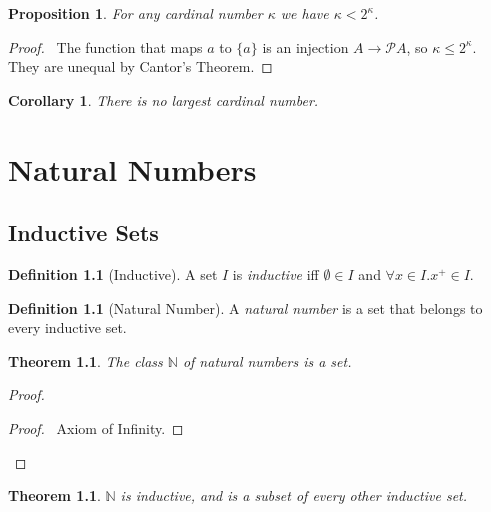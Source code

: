 \documentclass{book}
\let\qed\relax
\newtheorem{prop}[ax]{Proposition}
\newtheorem{cor}{Corollary}[ax]
\newtheorem{thm}[ax]{Theorem}
\theoremstyle{definition}
\newtheorem{df}[ax]{Definition}
\begin{document}
\begin{prop}
For any cardinal number $\kappa$ we have $\kappa < 2^\kappa$.
\end{prop}

\begin{proof}
\pf\ The function that maps $a$ to $\{a\}$ is an injection $A \rightarrow \mathcal{P} A$, so $\kappa \leq 2^\kappa$. They are unequal by Cantor's Theorem. \qed
\end{proof}

\begin{cor}
There is no largest cardinal number.
\end{cor}

\chapter{Natural Numbers}

\section{Inductive Sets}

\begin{df}[Inductive]
A set $I$ is \emph{inductive} iff $\emptyset \in I$ and $\forall x \in I. x^+ \in I$.
\end{df}

\begin{df}[Natural Number]
A \emph{natural number} is a set that belongs to every inductive set.
\end{df}

\begin{thm}
The class $\mathbb{N}$ of natural numbers is a set.
\end{thm}

\begin{proof}
\pf
{}
\begin{proof}
	\pf\ Axiom of Infinity.
\end{proof}
\qed
\end{proof}

\begin{thm}
$\mathbb{N}$ is inductive, and is a subset of every other inductive set.
\end{thm}
\end{document}
